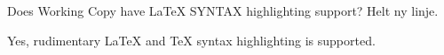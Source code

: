 \documentclass{article}
\begin{document}
\begin{question}
 Does Working Copy have LaTeX SYNTAX highlighting support?
 Helt ny linje.
\end{question}

\begin{answer}
 Yes, rudimentary LaTeX and TeX syntax highlighting is supported.
\end{answer}

\end{document}
